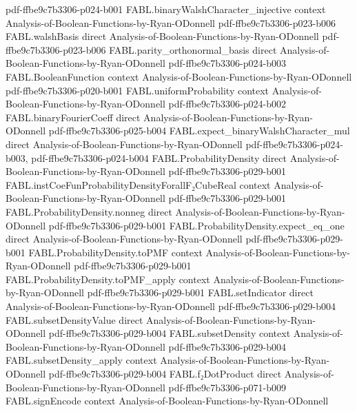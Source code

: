 \begin{theorem}
  {pdf-ffbe9c7b3306-p024-b001}
\proofstep
  {FABL.binaryWalshCharacter_injective}
  {context}
  {Analysis-of-Boolean-Functions-by-Ryan-ODonnell}
  {pdf-ffbe9c7b3306-p023-b006}
\proofstep
  {FABL.walshBasis}
  {direct}
  {Analysis-of-Boolean-Functions-by-Ryan-ODonnell}
  {pdf-ffbe9c7b3306-p023-b006}
\proofstep
  {FABL.parity_orthonormal_basis}
  {direct}
  {Analysis-of-Boolean-Functions-by-Ryan-ODonnell}
  {pdf-ffbe9c7b3306-p024-b003}
\proofstep
  {FABL.BooleanFunction}
  {context}
  {Analysis-of-Boolean-Functions-by-Ryan-ODonnell}
  {pdf-ffbe9c7b3306-p020-b001}
\proofstep
  {FABL.uniformProbability}
  {context}
  {Analysis-of-Boolean-Functions-by-Ryan-ODonnell}
  {pdf-ffbe9c7b3306-p024-b002}
\proofstep
  {FABL.binaryFourierCoeff}
  {direct}
  {Analysis-of-Boolean-Functions-by-Ryan-ODonnell}
  {pdf-ffbe9c7b3306-p025-b004}
\proofstep
  {FABL.expect_binaryWalshCharacter_mul}
  {direct}
  {Analysis-of-Boolean-Functions-by-Ryan-ODonnell}
  {pdf-ffbe9c7b3306-p024-b003,
    pdf-ffbe9c7b3306-p024-b004}
\proofstep
  {FABL.ProbabilityDensity}
  {direct}
  {Analysis-of-Boolean-Functions-by-Ryan-ODonnell}
  {pdf-ffbe9c7b3306-p029-b001}
\proofstep
  {FABL.instCoeFunProbabilityDensityForallF₂CubeReal}
  {context}
  {Analysis-of-Boolean-Functions-by-Ryan-ODonnell}
  {pdf-ffbe9c7b3306-p029-b001}
\proofstep
  {FABL.ProbabilityDensity.nonneg}
  {direct}
  {Analysis-of-Boolean-Functions-by-Ryan-ODonnell}
  {pdf-ffbe9c7b3306-p029-b001}
\proofstep
  {FABL.ProbabilityDensity.expect_eq_one}
  {direct}
  {Analysis-of-Boolean-Functions-by-Ryan-ODonnell}
  {pdf-ffbe9c7b3306-p029-b001}
\proofstep
  {FABL.ProbabilityDensity.toPMF}
  {context}
  {Analysis-of-Boolean-Functions-by-Ryan-ODonnell}
  {pdf-ffbe9c7b3306-p029-b001}
\proofstep
  {FABL.ProbabilityDensity.toPMF_apply}
  {context}
  {Analysis-of-Boolean-Functions-by-Ryan-ODonnell}
  {pdf-ffbe9c7b3306-p029-b001}
\proofstep
  {FABL.setIndicator}
  {direct}
  {Analysis-of-Boolean-Functions-by-Ryan-ODonnell}
  {pdf-ffbe9c7b3306-p029-b004}
\proofstep
  {FABL.subsetDensityValue}
  {direct}
  {Analysis-of-Boolean-Functions-by-Ryan-ODonnell}
  {pdf-ffbe9c7b3306-p029-b004}
\proofstep
  {FABL.subsetDensity}
  {context}
  {Analysis-of-Boolean-Functions-by-Ryan-ODonnell}
  {pdf-ffbe9c7b3306-p029-b004}
\proofstep
  {FABL.subsetDensity_apply}
  {context}
  {Analysis-of-Boolean-Functions-by-Ryan-ODonnell}
  {pdf-ffbe9c7b3306-p029-b004}
\proofstep
  {FABL.f₂DotProduct}
  {direct}
  {Analysis-of-Boolean-Functions-by-Ryan-ODonnell}
  {pdf-ffbe9c7b3306-p071-b009}
\proofstep
  {FABL.signEncode}
  {context}
  {Analysis-of-Boolean-Functions-by-Ryan-ODonnell}

\end{theorem}
